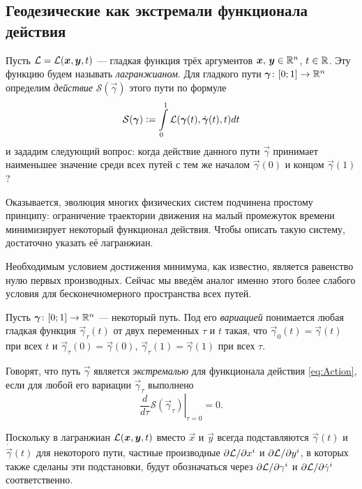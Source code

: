 \subsection{Геодезические как экстремали функционала действия}

Пусть $\mathcal{L} = \mathcal{L}(\boldsymbol{x}, \boldsymbol{y}, t)$ --- гладкая функция трёх аргументов $\boldsymbol{x},\,\boldsymbol{y} \in \mathbb{R}^n$, $t \in \mathbb{R}$. Эту функцию будем называть \textit{лагранжианом}. Для гладкого пути $\boldsymbol{\gamma}\colon [0; 1] \to \mathbb{R}^n$ определим \textit{действие} $\mathcal{S}(\vec{\gamma})$ этого пути по формуле
\begin{equation} \label{eq:Action}
	\mathcal{S}(\boldsymbol{\gamma}) \vcentcolon = \int\limits_0^1\mathcal{L}(\boldsymbol{\gamma}(t), \dot{\boldsymbol{\gamma}}(t), t)dt
\end{equation}
и зададим следующий вопрос: когда действие данного пути $\vec{\gamma}$ принимает наименьшее значение среди всех путей с тем же началом $\vec{\gamma}(0)$ и концом $\vec{\gamma}(1)$?

Оказывается, эволюция многих физических систем подчинена простому принципу: ограничение траектории движения на малый промежуток времени минимизирует некоторый функционал действия\footnotemark{}. Чтобы описать такую систему, достаточно указать её лагранжиан.


Необходимым условием достижения минимума, как известно, является равенство нулю первых производных. Сейчас мы введём аналог именно этого более слабого условия для бесконечномерного пространства всех путей.

\begin{definition}
	Пусть $\boldsymbol{\gamma}\colon [0; 1] \to \mathbb{R}^n$ --- некоторый путь. Под его \textit{вариацией} понимается любая гладкая функция $\vec{\gamma}_\tau(t)$ от двух переменных $\tau$ и $t$ такая, что $\vec{\gamma}_0(t) = \vec{\gamma}(t)$ при всех $t$ и $\vec{\gamma}_\tau(0) = \vec{\gamma}(0)$, $\vec{\gamma}_\tau(1) = \vec{\gamma}(1)$ при всех $\tau$.

	Говорят, что путь $\vec{\gamma}$ является \textit{экстремалью} для функционала действия \eqref{eq:Action}, если для любой его вариации $\vec{\gamma}_\tau$ выполнено
	\[
		\left.\frac{d}{d\tau}\mathcal{S}(\vec{\gamma}_\tau)\right|_{\tau = 0} = 0.
	\]
\end{definition}

Поскольку в лагранжиан $\mathcal{L}(\boldsymbol{x}, \boldsymbol{y}, t)$ вместо $\vec{x}$ и $\vec{y}$ всегда подставляются $\vec{\gamma}(t)$ и $\dot{\vec{\gamma}}(t)$ для некоторого пути, частные производные $\partial\mathcal{L} / \partial x^i$ и $\partial\mathcal{L} / \partial y^i$, в которых также сделаны эти подстановки, будут обозначаться через $\partial\mathcal{L} / \partial\gamma^i$ и $\partial\mathcal{L} / \partial\dot{\gamma}^i$ соответственно.

